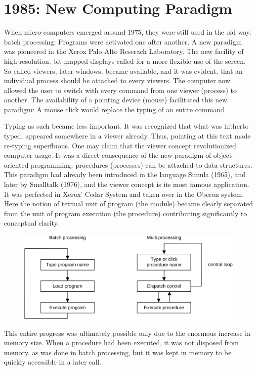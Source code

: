 \section{1985: New Computing Paradigm}
When micro-computers emerged around 1975, they were still used in the old way:
batch processing: Programs were activated one after another. A new paradigm
was pioneered in the Xerox Palo Alto Reserach Laboratory. The new facility of
high-resolution, bit-mapped displays called for a more flexible use of the screen.
So-called viewers, later windows, became available, and it was evident, that an
individual process should be attached to every viewers. The computer now allowed
the user to switch with every command from one viewer (process) to another. The
availability of a pointing device (mouse) facilitated this new paradigm: A mouse
click would replace the typing of an entire command.

Typing as such became less important. It was recognized that what was hitherto
typed, appeared somewhere in a viewer already. Thus, pointing at this text made
re-typing superfluous. One may claim that the viewer concept revolutionized
computer usage. It was a direct consequence of the new paradigm of object-oriented
programming: procedures (processes) can be attached to data structures. This
paradigm had already been introduced in the language Simula (1965), and later by
Smalltalk (1976), and the viewer concept is its most famous application. It was
perfected in Xerox' Cedar System and taken over in the Oberon system. Here the
notion of textual unit of program (the module) became clearly separated from the
unit of program execution (the procedure) contributing significantly to conceptual
clarity.
\begin{figure}[h!]
  \centering
  \includegraphics[width=\textwidth]{i/7}
\end{figure}

This entire progress was ultimately possible only due to the enormous increase in
memory size. When a procedure had been executed, it was not disposed from
memory, as was done in batch processing, but it was kept in memory to be quickly
accessible in a later call.
